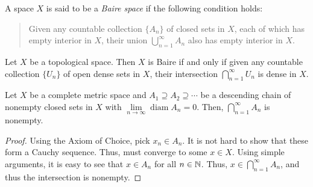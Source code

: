 \begin{definition}
    A space $X$ is said to be a \textit{Baire space} if the following condition holds: 
    \begin{quote}
        Given any countable collection $\{A_n\}$ of closed sets in $X$, each of which has empty interior in $X$, their union $\bigcup\limits_{n = 1}^\infty A_n$ also has empty interior in $X$.
    \end{quote}
\end{definition}

\begin{lemma}
    Let $X$ be a topological space. Then $X$ is Baire if and only if given any countable collection $\{U_n\}$ of open dense sets in $X$, their intersection $\bigcap\limits_{n = 1}^\infty U_n$ is dense in $X$.
\end{lemma}

\begin{lemma}
    Let $X$ be a complete metric space and $A_1\supseteq A_2\supseteq\cdots$ be a descending chain of nonempty closed sets in $X$ with $\lim\limits_{n\to\infty}\operatorname{diam} A_n = 0$. Then, $\bigcap\limits_{n = 1}^\infty A_n$ is nonempty.
\end{lemma}
\begin{proof}
    Using the Axiom of Choice, pick $x_n\in A_n$. It is not hard to show that these form a Cauchy sequence. Thus, must converge to some $x\in X$. Using simple arguments, it is easy to see that $x\in A_n$ for all $n\in\mathbb{N}$. Thus, $x\in\bigcap\limits_{n = 1}^\infty A_n$, and thus the intersection is nonempty.
\end{proof}

